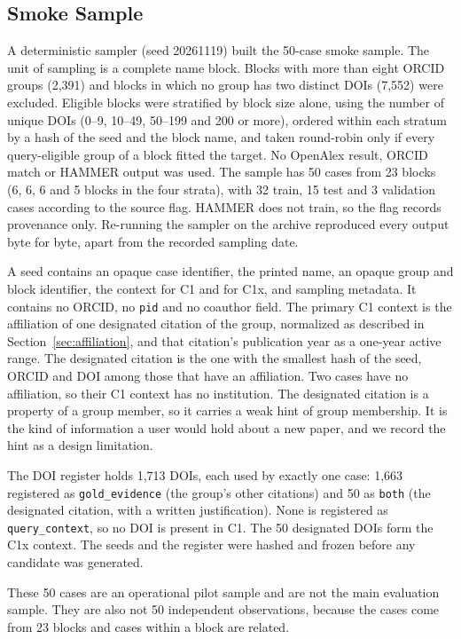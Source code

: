 \subsection{Smoke Sample}
\label{sec:seeds}
A deterministic sampler (seed 20261119) built the 50-case smoke sample. The unit of sampling is a complete name block. Blocks with more than eight ORCID groups (2,391) and blocks in which no group has two distinct DOIs (7,552) were excluded. Eligible blocks were stratified by block size alone, using the number of unique DOIs (0--9, 10--49, 50--199 and 200 or more), ordered within each stratum by a hash of the seed and the block name, and taken round-robin only if every query-eligible group of a block fitted the target. No OpenAlex result, ORCID match or HAMMER output was used. The sample has 50 cases from 23 blocks (6, 6, 6 and 5 blocks in the four strata), with 32 train, 15 test and 3 validation cases according to the source flag. HAMMER does not train, so the flag records provenance only. Re-running the sampler on the archive reproduced every output byte for byte, apart from the recorded sampling date.

A seed contains an opaque case identifier, the printed name, an opaque group and block identifier, the context for C1 and for C1x, and sampling metadata. It contains no ORCID, no \texttt{pid} and no coauthor field. The primary C1 context is the affiliation of one designated citation of the group, normalized as described in Section~\ref{sec:affiliation}, and that citation's publication year as a one-year active range. The designated citation is the one with the smallest hash of the seed, ORCID and DOI among those that have an affiliation. Two cases have no affiliation, so their C1 context has no institution. The designated citation is a property of a group member, so it carries a weak hint of group membership. It is the kind of information a user would hold about a new paper, and we record the hint as a design limitation.

The DOI register holds 1,713 DOIs, each used by exactly one case: 1,663 registered as \texttt{gold\_evidence} (the group's other citations) and 50 as \texttt{both} (the designated citation, with a written justification). None is registered as \texttt{query\_context}, so no DOI is present in C1. The 50 designated DOIs form the C1x context. The seeds and the register were hashed and frozen before any candidate was generated.

These 50 cases are an operational pilot sample and are not the main evaluation sample. They are also not 50 independent observations, because the cases come from 23 blocks and cases within a block are related.

